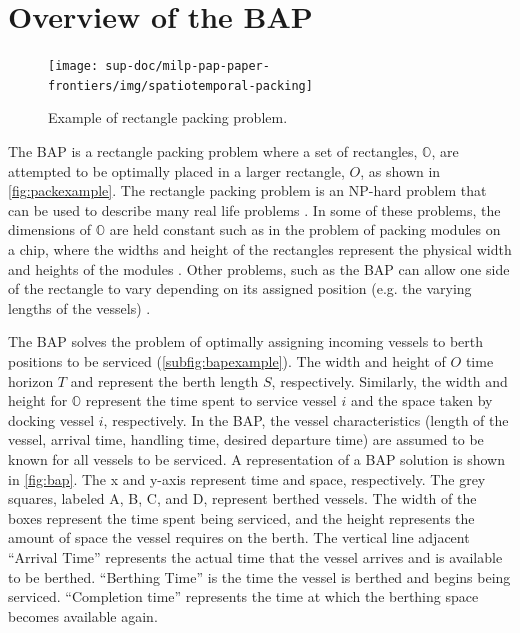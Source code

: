 \documentclass[ee,msthesis]{usuthesis}
\begin{document}
\section{Overview of the BAP}
\label{sec:overview-of-the-bap}
\begin{figure}
  \centering
  \texttt{[image: sup-doc/milp-pap-paper-frontiers/img/spatiotemporal-packing]}
  \caption{Example of rectangle packing problem.}
  \label{fig:packexample}
\end{figure}

The BAP is a rectangle packing problem where a set of rectangles, \(\mathbb{O}\), are attempted to be optimally placed in
a larger rectangle, \(O\), as shown in \autoref{fig:packexample}. The rectangle packing problem is an NP-hard problem that
can be used to describe many real life problems \cite{bruin-2013-rectan-packin,murata-1995-rectan}. In some of these
problems, the dimensions of \(\mathbb{O}\) are held constant such as in the problem of packing modules on a chip, where
the widths and height of the rectangles represent the physical width and heights of the modules
\cite{murata-1995-rectan}. Other problems, such as the BAP can allow one side of the rectangle to vary depending on its
assigned position (e.g. the varying lengths of the vessels) \cite{buhrkal-2011-model-discr}.

The BAP solves the problem of optimally assigning incoming vessels to berth positions to be serviced
(\autoref{subfig:bapexample}). The width and height of \(O\) time horizon \(T\) and represent the berth length \(S\),
respectively. Similarly, the width and height for \(\mathbb{O}\) represent the time spent to service vessel \(i\) and the
space taken by docking vessel \(i\), respectively. In the BAP, the vessel characteristics (length of the vessel, arrival
time, handling time, desired departure time) are assumed to be known for all vessels to be serviced. A representation of
a BAP solution is shown in \autoref{fig:bap}. The x and y-axis represent time and space, respectively. The grey squares,
labeled A, B, C, and D, represent berthed vessels. The width of the boxes represent the time spent being serviced, and
the height represents the amount of space the vessel requires on the berth. The vertical line adjacent
 ``Arrival Time'' represents the actual
time that the vessel arrives and is available to be berthed. ``Berthing Time'' is the time the vessel is berthed and
begins being serviced. ``Completion time'' represents the time at which the berthing space becomes available again.
\end{document}
